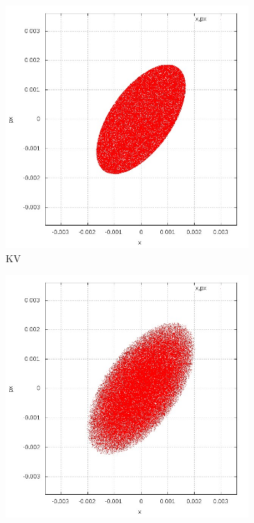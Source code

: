 \begin{figure}[!htb]
    \centering
    \begin{subfigure}[b]{0.40\textwidth}
        \includegraphics[width=\textwidth]{Img/KV_x_dx.jpg}
        \caption{KV}
    \end{subfigure}
    \begin{subfigure}[b]{0.40\textwidth}
        \includegraphics[width=\textwidth]{Img/WB_x_dx.jpg}

\end{subfigure}
\end{figure}
